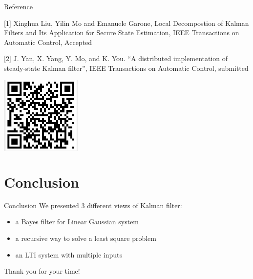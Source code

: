 \documentclass[10pt]{beamer}
\DeclareMathOperator{\1}{\textbf{1}}
\begin{document}
	      \begin{frame}{Reference}

		[1] Xinghua Liu, Yilin Mo and Emanuele Garone, Local Decompostion of Kalman Filters and Its Application for Secure State Estimation, IEEE Transactions on Automatic Control, Accepted

		[2] J. Yan, X. Yang, Y. Mo, and K. You. ``A distributed implementation of steady-state Kalman filter'', IEEE Transactions on Automatic Control, submitted

		\vspace{10pt}
		\centering
		\includegraphics[width=0.3\textwidth]{pic/qr.jpeg}
	      \end{frame}

	      \section{Conclusion}

	      \begin{frame}{Conclusion}
		We presented 3 different views of Kalman filter:
		\begin{itemize}
		  \item a Bayes filter for Linear Gaussian system 
		  \item a recursive way to solve a least square problem
		  \item an LTI system with multiple inputs
		\end{itemize}
	      \end{frame}

	      \begin{frame}[standout]
		Thank you for your time! 
	      \end{frame}

	      
\end{document}

